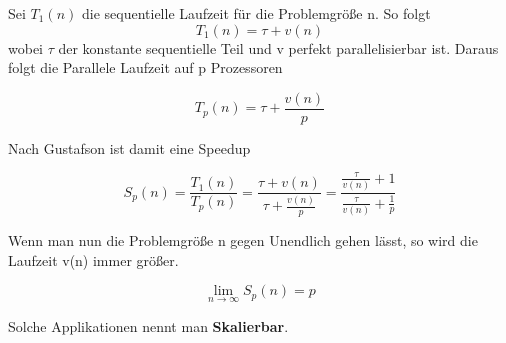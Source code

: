 Sei \(T_1(n)\) die sequentielle Laufzeit für die Problemgröße n. So folgt
\[ T_1(n) = \tau + v(n)\]
wobei \(\tau\) der konstante sequentielle Teil und v perfekt parallelisierbar ist. Daraus folgt die
Parallele Laufzeit auf p Prozessoren

\[ T_p(n) = \tau + \frac{v(n)}{p}\]

Nach Gustafson ist damit eine Speedup

\[ S_p(n) = \frac{T_1(n)}{T_p(n)} = \frac{\tau + v(n)}{\tau + \frac{v(n)}{p}} = \frac{\frac{\tau}{v(n)} + 1}{\frac{\tau}{v(n)} + \frac{1}{p}} \]

Wenn man nun die Problemgröße n gegen Unendlich gehen lässt, so wird die Laufzeit v(n) immer größer.

\[ \lim_{n \rightarrow \infty} S_p(n) = p\]

Solche Applikationen nennt man \textbf{Skalierbar}.
